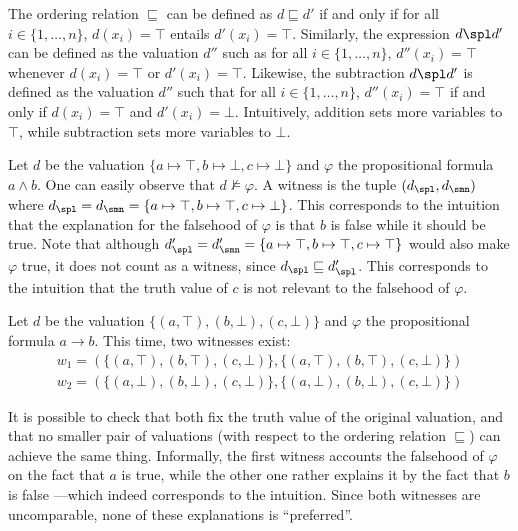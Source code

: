 {The ordering relation $\sqsubseteq$ can be defined as $d \sqsubseteq d'$ if and only if for all $i \in \{1, \dots, n\}$, $d(x_i) = \top$ entails $d'(x_i) = \top$. Similarly, the expression $d \spl d'$ can be defined as the valuation $d''$ such as for all $i \in \{1, \dots, n\}$, $d''(x_i) = \top$ whenever $d(x_i) = \top$ or $d'(x_i) = \top$. Likewise, the subtraction $d \spl d'$ is defined as the valuation $d''$ such that for all $i \in \{1, \dots, n\}$, $d''(x_i) = \top$ if and only if $d(x_i) = \top$ and $d'(x_i) = \bot$. Intuitively, addition sets more variables to $\top$, while subtraction sets more variables to $\bot$.

\begin{example}
Let $d$ be the valuation $\{a \mapsto \top, b \mapsto \bot, c \mapsto \bot\}$ and $\varphi$ the propositional formula $a \wedge b$. One can easily observe that $d \not\models \varphi$. A witness is the tuple $(d_\spl,d_\smn)$ where $d_\spl = d_\smn =  \{a \mapsto \top, b \mapsto \top, c \mapsto \bot\}$. This corresponds to the intuition that the explanation for the falsehood of $\varphi$ is that $b$ is false while it should be true. Note that although $d'_\spl = d'_\smn =  \{a \mapsto \top, b \mapsto \top, c \mapsto \top\}$ would also make $\varphi$ true, it does not count as a witness, since $d_\spl \sqsubseteq d'_\spl$. This corresponds to the intuition that the truth value of $c$ is not relevant to the falsehood of $\varphi$.
\end{example}

\begin{example}
Let $d$ be the valuation $\{(a,\top),(b,\bot),(c,\bot)\}$ and $\varphi$ the propositional formula $a \rightarrow b$. This time, two witnesses exist:
%
\begin{eqnarray*}
& w_1 = (\{(a,\top),(b,\top),(c,\bot)\}, \{(a,\top),(b,\top),(c,\bot)\}) & \\
& w_2 = (\{(a,\bot),(b,\bot),(c,\bot)\}, \{(a,\bot),(b,\bot),(c,\bot)\}) & 
\end{eqnarray*}

It is possible to check that both fix the truth value of the original valuation, and that no smaller pair of valuations (with respect to the ordering relation $\sqsubseteq$) can achieve the same thing. Informally, the first witness accounts the falsehood of $\varphi$ on the fact that $a$ is true, while the other one rather explains it by the fact that $b$ is false ---which indeed corresponds to the intuition. Since both witnesses are uncomparable, none of these explanations is ``preferred''.
\end{example}

}
